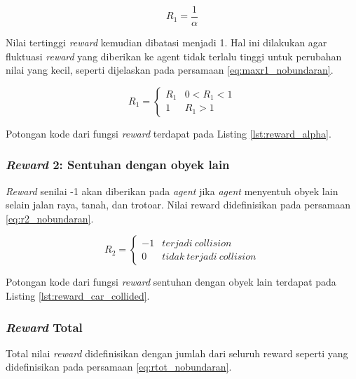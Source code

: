 \begin{equation}
	R_1 = \frac{1}{\alpha}
	\label{eq:r1_nobundaran}
\end{equation}

Nilai tertinggi \textit{reward} kemudian dibatasi menjadi 1. Hal ini dilakukan agar fluktuasi \textit{reward }yang diberikan ke agent tidak terlalu tinggi untuk perubahan nilai yang kecil, seperti dijelaskan pada persamaan \ref{eq:maxr1_nobundaran}.


\begin{equation}
	R_1 = \begin{cases}R_1 & 0 < R_1 < 1\\1 & R_1 > 1\end{cases}
	\label{eq:maxr1_nobundaran}
\end{equation}


Potongan kode dari fungsi \textit{reward} terdapat pada Listing \ref{lst:reward_alpha}.

\subsubsection{\textit{Reward} 2: Sentuhan dengan obyek lain}
\textit{Reward} senilai -1 akan diberikan pada \textit{agent} jika \textit{agent} menyentuh obyek lain selain jalan raya, tanah, dan trotoar. Nilai reward didefinisikan pada persamaan \ref{eq:r2_nobundaran}.

\begin{equation}
	R_2 = \begin{cases}-1 & terjadi\: collision\\0 & tidak\:terjadi\: collision\end{cases}
	\label{eq:r2_nobundaran}
\end{equation}

Potongan kode dari fungsi \textit{reward} sentuhan dengan obyek lain terdapat pada Listing \ref{lst:reward_car_collided}.

\subsubsection{\textit{Reward }Total}
Total nilai \textit{reward} didefinisikan dengan jumlah dari seluruh reward seperti yang didefinisikan pada persamaan \ref{eq:rtot_nobundaran}.

